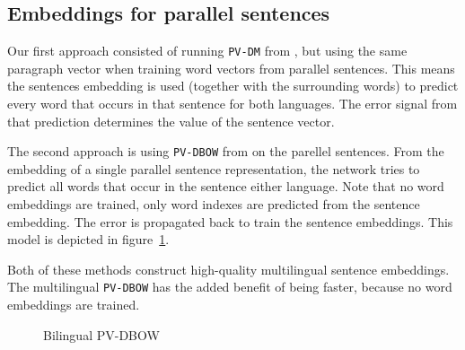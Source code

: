 \subsection{Embeddings for parallel sentences}



Our first approach consisted of running \texttt{PV-DM} from \cite{Le2014}, 
but using the same paragraph vector when training word vectors from parallel sentences.
This means the sentences embedding is used (together with the surrounding words) to predict every word that occurs in that sentence for both languages.
The error signal from that prediction determines the value of the sentence vector.



The second approach is using \texttt{PV-DBOW} from \cite{Le2014} on the parellel sentences.
From the embedding of a single parallel sentence representation, the network tries to predict all words that occur in the sentence either language.
Note that no word embeddings are trained, only word indexes are predicted from the sentence embedding.
The error is propagated back to train the sentence embeddings.
This model is depicted in figure~\ref{f:bilingual_dbow}.


Both of these methods construct high-quality multilingual sentence embeddings.
The multilingual \texttt{PV-DBOW} has the added benefit of being faster, because no word embeddings are trained.


\begin{figure}

\center

\caption{Bilingual PV-DBOW}
\label{f:bilingual_dbow}
\end{figure}


% 

